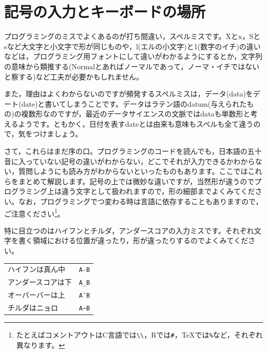 \documentclass{ltjsbook}
\begin{document}
\VerbatimFootnotes
\chapter{記号の入力とキーボードの場所}
\label{signs}
プログラミングのミスでよくあるのが打ち間違い，スペルミスです。Xとx，Sとsなど大文字と小文字で形が同じものや，l(エルの小文字)と1(数字のイチ)の違いなどは，プログラミング用フォントにして違いがわかるようにするとか，文字列の意味から類推する(Normalとあればノーマルであって，ノーマ・イチではないと察する)など工夫が必要かもしれません。

また，理由はよくわからないのですが頻発するスペルミスは，データ(data)をデート(date)と書いてしまうことです。データはラテン語のdatum(与えられたもの)の複数形なのですが，最近のデータサイエンスの文脈ではdataも単数形と考えるようです。ともかく，日付を表すdateとは由来も意味もスペルも全て違うので，気をつけましょう。

さて，これらはまだ序の口。プログラミングのコードを読んでも，日本語の五十音に入っていない記号の違いがわからない，どこでそれが入力できるかわからない，質問しようにも読み方がわからないといったものもあります。ここではこれらをまとめて解説します。記号の上では微妙な違いですが，当然形が違うのでプログラミング上は違う文字として扱われますので，形の細部までよくみてください。なお，プログラミングでつ変わる時は言語に依存することもありますので，ご注意ください\footnote{たとえばコメントアウトはC言語では\verb|\\|，Rでは\verb|#|，TeXでは\verb|%|など，それぞれ異なります。}。

特に目立つのはハイフンとチルダ，アンダースコアの入力ミスです。それぞれ文字を書く領域における位置が違ったり，形が違ったりするのでよくみてください。
\begin{center}

	\Large{
		\begin{tabular}{ll}
			ハイフンは真ん中  & \verb|A-B| \\
			アンダースコアは下 & \verb|A_B| \\
			オーバーバーは上  & \verb|A¯B| \\
			チルダはニョロ   & \verb|A~B| \\
		\end{tabular}
	}

\end{center}
\end{document}
